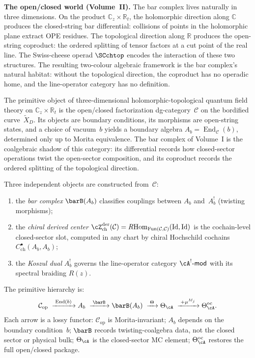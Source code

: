 
\bigskip

\noindent\textbf{The open/closed world (Volume~II).}
The bar complex lives naturally in three dimensions. On the product
$\mathbb C_z \times \mathbb R_t$, the holomorphic direction along
$\mathbb C$ produces the closed-string bar differential: collisions of
points in the holomorphic plane extract OPE residues. The topological
direction along $\mathbb R$ produces the open-string coproduct: the
ordered splitting of tensor factors at a cut point of the real line.
The Swiss-cheese operad $\SCchtop$ encodes the interaction of these two
structures. The resulting two-colour algebraic framework is the
bar complex's natural habitat: without the topological direction, the
coproduct has no operadic home, and the line-operator category has no
definition.

The primitive object of three-dimensional holomorphic-topological
quantum field theory on $\mathbb C_z \times \mathbb R_t$ is the
open/closed factorization dg-category~$\mathcal C$ on the bordified
curve~$\widetilde{X}_D$. Its objects are boundary conditions, its
morphisms are open-string states, and a choice of vacuum~$b$ yields a
boundary algebra $A_b = \operatorname{End}_{\mathcal C}(b)$, determined
only up to Morita equivalence. The bar complex of Volume~I is the
coalgebraic shadow of this category: its differential records how
closed-sector operations twist the open-sector composition, and its
coproduct records the ordered splitting of the topological direction.

Three independent objects are constructed from~$\mathcal C$:
\begin{enumerate}[label=\textup{(\roman*)},nosep]
\item the \emph{bar complex} $\barB(A_b)$ classifies couplings
 between $A_b$ and~$A_b^!$ (twisting morphisms);
\item the \emph{chiral derived center}
 $\cZ^{\mathrm{der}}_{\mathrm{ch}}(\mathcal C) =
 R\!\operatorname{Hom}_{\operatorname{Fun}(\mathcal C,\mathcal C)}
 (\operatorname{Id}, \operatorname{Id})$
 is the cochain-level closed-sector slot, computed in any chart by
 chiral Hochschild cochains $C^\bullet_{\mathrm{ch}}(A_b, A_b)$;
\item the \emph{Koszul dual} $A_b^!$ governs the line-operator
 category $\cA^!\text{-}\mathsf{mod}$ with its spectral braiding
 $R(z)$.
\end{enumerate}
The primitive hierarchy is:
\[
\mathcal C_{\mathrm{op}}
\;\xrightarrow{\;\operatorname{End}(b)\;}
A_b
\;\xrightarrow{\;\barB\;}
\barB(A_b)
\;\xrightarrow{\;\Theta\;}
\Theta_\cA
\;\xrightarrow{\;+\mu^{M_j}\;}
\Theta^{\mathrm{oc}}_\cA.
\]
Each arrow is a lossy functor: $\mathcal C_{\mathrm{op}}$ is
Morita-invariant; $A_b$ depends on the boundary
condition~$b$; $\barB$ records twisting-coalgebra data, not the
closed sector or physical bulk; $\Theta_\cA$ is the closed-sector
MC element; $\Theta^{\mathrm{oc}}_\cA$ restores the full
open/closed package.

